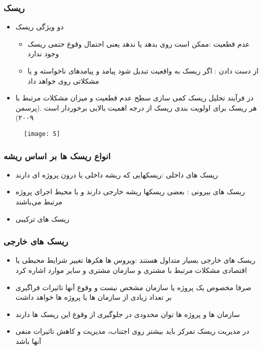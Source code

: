 \documentclass[xcolor=dvipsnames,professionalfonts]{beamer}
\begin{document}
\begin{frame}
	
	\frametitle{ریسک}

	\begin{itemize}
		
		\item دو ویژگی ریسک 
			\begin{itemize}
			\item عدم قطعیت   :ممکن است روی بدهد یا ندهد یعنی احتمال وقوع حتمی ریسک وجود ندارد
			\item 		از دست دادن  : اگر ریسک به واقعیت تبدیل شود پیامد و پیامدهای ناخواسته و یا مشکلاتی روی خواهد داد 
			 
		\end{itemize}
		\item در فرآیند تحلیل ریسک کمی سازی سطح عدم قطعیت و میزان مشکلات مرتبط با هر ریسک برای اولویت بندی ریسک از درجه اهمیت بالایی برخوردار است .(پرسمن ۲۰۰۹)

	\end{itemize}
\end{frame}
\begin{frame}
	\begin{figure}
		\centering
		\texttt{[image: 5]}
		\label{fig:5}
	\end{figure}
	
\end{frame}
\begin{frame}
	\frametitle{انواع ریسک ها بر اساس ریشه}




	
	\begin{itemize}
		\item 	ریسک های داخلی :ریسکهایی که ریشه داخلی یا درون پروژه ای دارند
		\item 	ریسک های بیرونی : بعضی ریسکها ریشه خارجی دارند و با محیط اجرای پروژه مرتبط می‌باشند 
		\item 	ریسک های ترکیبی
	\end{itemize}
\end{frame}
\begin{frame}
	\frametitle{ریسک های خارجی}
	\begin{itemize}
		\item ریسک های خارجی بسیار متداول هستند :ویروس ها هکرها تغییر شرایط محیطی یا اقتصادی مشکلات مرتبط با مشتری و سازمان مشتری و سایر موارد اشاره کرد 
		\item صرفا مخصوص یک پروژه یا سازمان مشخص نیست و وقوع آنها تاثیرات فراگیری بر تعداد زیادی از سازمان ها یا پروژه ها خواهد داشت
		\item 	سازمان ها و پروژه ها توان محدودی در جلوگیری از وقوع این ریسک ها دارند 
		\item در مدیریت ریسک تمرکز باید بیشتر روی اجتناب، مدیریت و کاهش تاثیرات منفی آنها باشد
	\end{itemize}
\end{frame}
\end{document}

